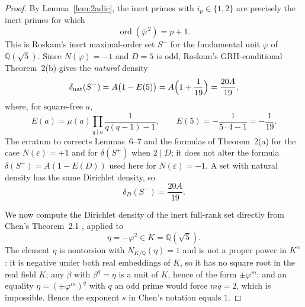 \documentclass[11pt]{amsart}
\theoremstyle{plain}
\theoremstyle{definition}
\begin{document}
\begin{proof}
By Lemma~\ref{lem:2adic}, the inert primes with $i_p\in\{1,2\}$ are
precisely the inert primes for which
\[
\operatorname{ord}(\bar\varphi^{\,2})=p+1.
\]
This is Roskam's inert maximal-order set $S^-$ for the fundamental
unit $\varphi$ of $\mathbb Q(\sqrt5)$. Since $N(\varphi)=-1$ and
$D=5$ is odd, Roskam's GRH-conditional Theorem~2(b)
\cite{Roskam2000} gives the \emph{natural} density
\[
\delta_{\mathrm{nat}}(S^-)=A\bigl(1-E(5)\bigr)
=A\Bigl(1+\frac1{19}\Bigr)=\frac{20A}{19},
\]
where, for square-free $a$,
\[
E(a)=\mu(a)\prod_{q\mid a}\frac{1}{q(q-1)-1},
\qquad
E(5)=-\frac{1}{5\cdot4-1}=-\frac1{19}.
\]
The erratum to \cite{Roskam2000} corrects Lemmas~6--7 and the
formulas of Theorem~2(a) for the case $N(\varepsilon)=+1$ and for
$\delta(S^+)$ when $2\mid D$; it does not alter the formula
$\delta(S^-)=A(1-E(D))$ used here for $N(\varepsilon)=-1$. A set
with natural density has the same Dirichlet density, so
\[
\delta_D(S^-)=\frac{20A}{19}.
\]

We now compute the Dirichlet density of the inert full-rank set
directly from Chen's Theorem~2.1 \cite{Chen2002}, applied to
\[
\eta=-\varphi^2\in K=\mathbb Q(\sqrt5).
\]
The element $\eta$ is nontorsion with $N_{K/\mathbb Q}(\eta)=1$ and
is not a proper power in $K^\times$: it is negative under both real
embeddings of $K$, so it has no square root in the real field $K$;
any $\beta$ with $\beta^q=\eta$ is a unit of $K$, hence of the form
$\pm\varphi^m$; and an equality $\eta=(\pm\varphi^m)^q$ with $q$ an odd
prime would force $mq=2$, which is impossible. Hence the exponent $s$ in
Chen's notation equals $1$.


\end{proof}
\end{document}
